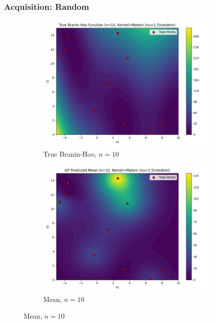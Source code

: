\documentclass[a4paper,12pt]{article}
\begin{document}
\subsubsection*{Acquisition: Random}
\begin{figure}[H]
\centering  

\begin{subfigure}{0.3\textwidth}
  \includegraphics[width=\linewidth]{Task-02/images/true_function_matern_n10_random.png}
  \caption{True Branin-Hoo, $n=10$}
\end{subfigure}
\begin{subfigure}{0.3\textwidth}
    \includegraphics[width=\linewidth]{Task-02/images/gp_mean_matern_n10_random.png}
    \caption{Mean, $n=10$}

\end{subfigure}
\end{figure}
\end{document}
